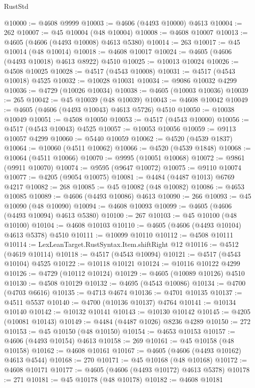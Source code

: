 \begin{lexlean}{RustStd}
\begin{coremodule}
@10000 := @4608 @9999
@10003 := @4606 (@4493 @10000) @4613
@10004 := 262
@10007 := @45 @10004 (@48 @10004)
@10008 := @4608 @10007
@10013 := @4605 (@4606 (@4493 @10008) @4613 @5380)
@10014 := 263
@10017 := @45 @10014 (@48 @10014)
@10018 := @4608 @10017
@10024 := @4605 (@4606 (@4493 @10018) @4613 @8922) @4510
@10025 := @10013 @10024
@10026 := @4508 @10025
@10028 := @4517 (@4543 @10008)
@10031 := @4517 (@4543 @10018) @4525
@10032 := @10028 @10031
@10034 := @9086 @10032 @4299
@10036 := @4729 (@10026 @10034)
@10038 := @4605 (@10003 @10036)
@10039 := 265
@10042 := @45 @10039 (@48 @10039)
@10043 := @4608 @10042
@10049 := @4605 (@4606 (@4493 @10043) @4613 @5726) @4510
@10050 := @10038 @10049
@10051 := @4508 @10050
@10053 := @4517 (@4543 @10000)
@10056 := @4517 (@4543 @10043) @4525
@10057 := @10053 @10056
@10059 := @9113 @10057 @4299
@10060 := @5440 @10059
@10062 := @4520 (@4539 @1837)
@10064 := @10060 (@4511 @10062)
@10066 := @4520 (@4539 @1848)
@10068 := @10064 (@4511 @10066)
@10070 := @9995 (@10051 @10068)
@10072 := @9861 (@9911 @10070)
@10074 := @9595 (@9647 @10072)
@10075 := @9110 @10074
@10077 := @4205 (@9054 @10075)
@10081 := @4484 (@4487 @1013) @6769 @4217
@10082 := 268
@10085 := @45 @10082 (@48 @10082)
@10086 := @4653 @10085
@10089 := @4606 (@4493 @10086) @4613
@10090 := 266
@10093 := @45 @10090 (@48 @10090)
@10094 := @4608 @10093
@10099 := @4605 (@4606 (@4493 @10094) @4613 @5380)
@10100 := 267
@10103 := @45 @10100 (@48 @10100)
@10104 := @4608 @10103
@10110 := @4605 (@4606 (@4493 @10104) @4613 @5378) @4510
@10111 := @10099 @10110
@10112 := @4508 @10111
@10114 := LexLeanTarget.RustSyntax.Item.shiftRight @12
@10116 := @4512 (@4619 @10114)
@10118 := @4517 (@4543 @10094)
@10121 := @4517 (@4543 @10104) @4525
@10122 := @10118 @10121
@10124 := @10116 @10122 @4299
@10126 := @4729 (@10112 @10124)
@10129 := @4605 (@10089 @10126) @4510
@10130 := @4508 @10129
@10132 := @4695 (@4543 @10086)
@10134 := @4700 (@4703 @6616)
@10135 := @4713 @4674
@10136 := @4701 @10135
@10137 := @4511 @5537
@10140 := @4700 (@10136 @10137) @4764
@10141 := @10134 @10140
@10142 := @10132 @10141
@10143 := @10130 @10142
@10145 := @4205 (@10081 @10143)
@10149 := @4484 (@4487 @1026) @8236 @4289
@10150 := 272
@10153 := @45 @10150 (@48 @10150)
@10154 := @4653 @10153
@10157 := @4606 (@4493 @10154) @4613
@10158 := 269
@10161 := @45 @10158 (@48 @10158)
@10162 := @4608 @10161
@10167 := @4605 (@4606 (@4493 @10162) @4613 @4544)
@10168 := 270
@10171 := @45 @10168 (@48 @10168)
@10172 := @4608 @10171
@10177 := @4605 (@4606 (@4493 @10172) @4613 @5378)
@10178 := 271
@10181 := @45 @10178 (@48 @10178)
@10182 := @4608 @10181

\end{coremodule}
\end{lexlean}
